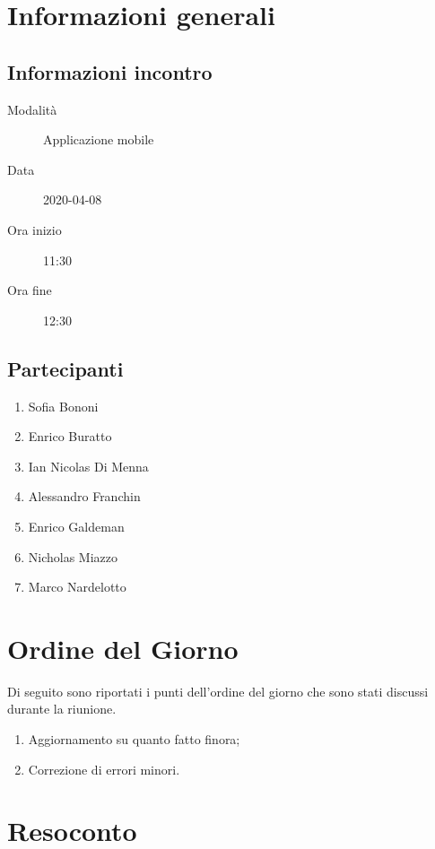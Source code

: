 \documentclass{article}
\begin{document}


\section{Informazioni generali}%
\label{sec:informazioni_generali}

\subsection{Informazioni incontro}%
\label{sub:informazioni_incontro}

\begin{description}
  \item[Modalità] Applicazione mobile 
  \item[Data] 2020-04-08
  \item[Ora inizio] 11:30
  \item[Ora fine] 12:30
\end{description}

\subsection{Partecipanti}%
\label{sub:partecipanti}

\begin{enumerate}
  \item Sofia Bononi
  \item Enrico Buratto
  \item Ian Nicolas Di Menna
  \item Alessandro Franchin
  \item Enrico Galdeman
  \item Nicholas Miazzo
  \item Marco Nardelotto
\end{enumerate}

\section{Ordine del Giorno}%
\label{ordine_del_giorno}
Di seguito sono riportati i punti dell'ordine del giorno che sono stati discussi durante la riunione.
\begin{enumerate}
  \item Aggiornamento su quanto fatto finora;
  \item Correzione di errori minori.
\end{enumerate}

\section{Resoconto}%
\label{resoconto}
\end{document}
